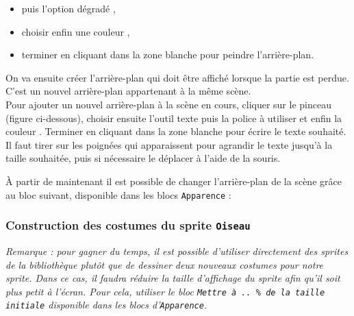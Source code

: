 
\begin{itemize}
\item puis l'option dégradé , 
\item choisir enfin une couleur , 
\item terminer en cliquant dans la zone blanche pour peindre l'arrière-plan.
\end{itemize}

	      
On va ensuite créer l'arrière-plan qui doit être affiché lorsque la partie est perdue. C'est un nouvel arrière-plan appartenant à la même scène.\\

Pour ajouter un nouvel arrière-plan à la scène en cours, cliquer sur le pinceau  (figure ci-dessous), choisir ensuite l'outil texte  puis la police à utiliser  et enfin la couleur . Terminer en cliquant dans la zone blanche pour écrire le texte souhaité. Il faut tirer sur les poignées qui apparaissent pour agrandir le texte jusqu'à la taille souhaitée, puis si nécessaire le déplacer à l'aide de la souris.




À partir de maintenant il est possible de changer l'arrière-plan de la scène grâce au bloc suivant, disponible dans les blocs \texttt{Apparence} :








\subsubsection{Construction des costumes du sprite \texttt{Oiseau}}

\emph{Remarque : pour gagner du temps, il est possible d'utiliser directement des sprites de la bibliothèque plutôt que de dessiner deux nouveaux costumes pour notre sprite. Dans ce cas, il faudra réduire la taille d'affichage du sprite afin qu'il soit plus petit à l'écran. Pour cela, utiliser le bloc \texttt{Mettre à ..\,\% de la taille initiale} disponible dans les blocs d'\texttt{Apparence}.}

